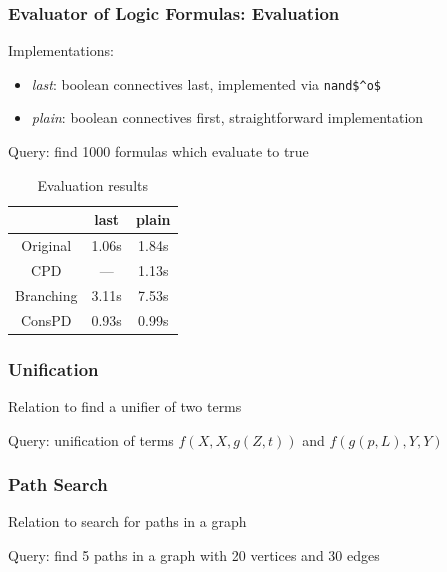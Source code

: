\documentclass[xcolor=table]{beamer}
\begin{document}
\begin{frame}[fragile]
  \frametitle{Evaluator of Logic Formulas: Evaluation}
Implementations:

\begin{itemize}
  \item \emph{last}: boolean connectives last, implemented via \lstinline{nand$^o$}
  \item \emph{plain}: boolean connectives first, straightforward implementation
\end{itemize}

\vspace{0.5cm}

Query: find 1000 formulas which evaluate to true

\vspace{0.5cm}

\begin{table}
  \centering
  \begin{tabular}{c||c|c}
                   & last  & plain  \\ \hline\hline
  Original         & 1.06s & 1.84s  \\ \hline
  CPD              & ---   & 1.13s  \\ \hline
  Branching        & 3.11s & 7.53s  \\ \hline
  ConsPD           & \cellcolor{green!20}0.93s & \cellcolor{green!20}0.99s  \\ \hline
  \end{tabular}

  \caption{Evaluation results}
\end{table}
\end{frame}

\begin{frame}[fragile]
  \frametitle{Unification}

\begin{center}
  Relation to find a unifier of two terms

  \vspace{0.5cm}

  Query: unification of terms $f (X, X, g(Z,t))$ and $f (g(p,L),Y,Y)$
\end{center}
\end{frame}

\begin{frame}[fragile]
  \frametitle{Path Search}

\begin{center}
  Relation to search for paths in a graph

  \vspace{0.5cm}

  Query: find 5 paths in a graph with 20 vertices and 30 edges
\end{center}

\end{frame}
\end{document}
